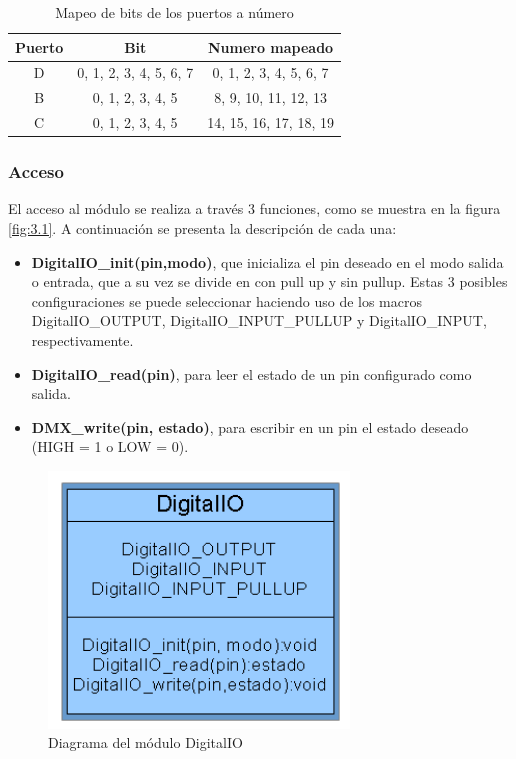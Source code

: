 \begin{table}[!ht]
	\begin{center}
		\begin{tabular}{|c|c|c|}
			\hline
			\rowcolor{OODlightblue}
			\textbf{Puerto} & \textbf{Bit} & \textbf{Numero mapeado} \\
			\hline \hline
			D & 0, 1, 2, 3, 4, 5, 6, 7 & 0, 1, 2, 3, 4, 5, 6, 7 \\
			\hline
			B & 0, 1, 2, 3, 4, 5 & 8, 9, 10, 11, 12, 13 \\
			\hline
			C & 0, 1, 2, 3, 4, 5 & 14, 15, 16, 17, 18, 19\\
			\hline
		\end{tabular}
	\end{center}
	\caption{Mapeo de bits de los puertos a número}
	\label{table:\thetable}
\end{table}


\subsubsection{Acceso}
El acceso al módulo se realiza a través 3 funciones, como se muestra en la figura \ref{fig:3.1}. A continuación se presenta la descripción de cada una:
\begin{itemize}
	\item \textbf{DigitalIO\_init(pin,modo)}, que inicializa el pin deseado en el modo salida o entrada, que a su vez se divide en con pull up y sin pullup. Estas 3 posibles configuraciones se puede seleccionar haciendo uso de los macros DigitalIO\_OUTPUT, DigitalIO\_INPUT\_PULLUP y DigitalIO\_INPUT, respectivamente.
	\item \textbf{DigitalIO\_read(pin)}, para leer el estado de un pin configurado como salida.
	\item \textbf{DMX\_write(pin, estado)}, para escribir en un pin el estado deseado (HIGH = 1 o LOW = 0).
\end{itemize}

\begin{figure}[!ht]
	\centering
	\includegraphics[width=8cm,scale=1]{resources/3_1-moduloDigitalIO.png}
	\caption{Diagrama del módulo DigitalIO}
	\label{fig:\thefigure}
\end{figure}

